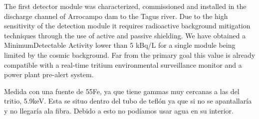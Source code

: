 The first detector module was characterized, commissioned and installed in the discharge channel of Arrocampo dam to the Tagus river. Due to the high sensitivity of the detection module it requires radioactive background mitigation techniques through the use of active and passive shielding. We have obtained a MinimumDetectable Activity lower than 5 kBq/L for a single module being limited by the cosmic background. Far from the primary goal this value is already compatible with a real-time tritium environmental surveillance monitor and a power plant pre-alert system.


Medida con una fuente de 55Fe, ya que tiene gammas muy cercanas a las del tritio, 5.9keV. Esta se situo dentro del tubo de teflón ya que si no se apantallaría y no llegaría  ala fibra. Debido a esto no podíamos usar agua en su interior.


